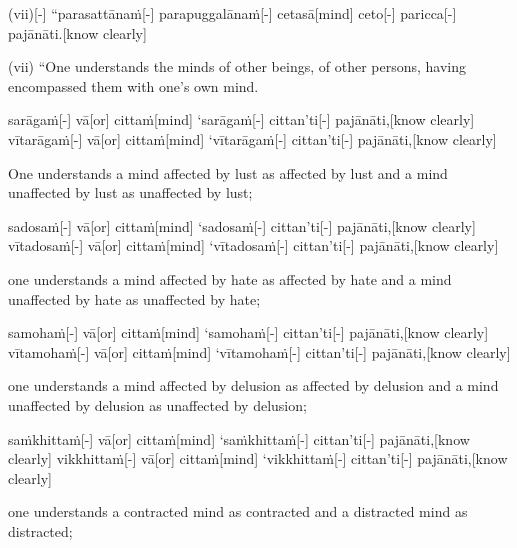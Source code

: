\begin{samepage}
\begingl[glneveryline={\PaliGlossA,\PaliGlossB}]
(vii)[-] “parasattānaṁ[-] parapuggalānaṁ[-] cetasā[mind] ceto[-] paricca[-] pajānāti.[know clearly]
\endgl
\nopagebreak
\linespread{0.5}
\begin{spacin}{0.2}
{\PaliGlossFT (vii) “One understands the minds of other beings, of other persons, having encompassed them with one’s own mind.}
\end{spacin}
\vskip 12pt
\end{samepage}
\begin{samepage}
\begingl[glneveryline={\PaliGlossA,\PaliGlossB}]
sarāgaṁ[-] vā[or] cittaṁ[mind] ‘sarāgaṁ[-] cittan’ti[-] pajānāti,[know clearly] vītarāgaṁ[-] vā[or] cittaṁ[mind] ‘vītarāgaṁ[-] cittan’ti[-] pajānāti,[know clearly]
\endgl
\nopagebreak
\linespread{0.5}
\begin{spacin}{0.2}
{\PaliGlossFT One understands a mind affected by lust as affected by lust and a mind unaffected by lust as unaffected by lust;}
\end{spacin}
\vskip 12pt
\end{samepage}
\begin{samepage}
\begingl[glneveryline={\PaliGlossA,\PaliGlossB}]
sadosaṁ[-] vā[or] cittaṁ[mind] ‘sadosaṁ[-] cittan’ti[-] pajānāti,[know clearly] vītadosaṁ[-] vā[or] cittaṁ[mind] ‘vītadosaṁ[-] cittan’ti[-] pajānāti,[know clearly]
\endgl
\nopagebreak
\linespread{0.5}
\begin{spacin}{0.2}
{\PaliGlossFT one understands a mind affected by hate as affected by hate and a mind unaffected by hate as unaffected by hate;}
\end{spacin}
\vskip 12pt
\end{samepage}
\begin{samepage}
\begingl[glneveryline={\PaliGlossA,\PaliGlossB}]
samohaṁ[-] vā[or] cittaṁ[mind] ‘samohaṁ[-] cittan’ti[-] pajānāti,[know clearly] vītamohaṁ[-] vā[or] cittaṁ[mind] ‘vītamohaṁ[-] cittan’ti[-] pajānāti,[know clearly]
\endgl
\nopagebreak
\linespread{0.5}
\begin{spacin}{0.2}
{\PaliGlossFT one understands a mind affected by delusion as affected by delusion and a mind unaffected by delusion as unaffected by delusion;}
\end{spacin}
\vskip 12pt
\end{samepage}
\begin{samepage}
\begingl[glneveryline={\PaliGlossA,\PaliGlossB}]
saṁkhittaṁ[-] vā[or] cittaṁ[mind] ‘saṁkhittaṁ[-] cittan’ti[-] pajānāti,[know clearly] vikkhittaṁ[-] vā[or] cittaṁ[mind] ‘vikkhittaṁ[-] cittan’ti[-] pajānāti,[know clearly]
\endgl
\nopagebreak
\linespread{0.5}
\begin{spacin}{0.2}
{\PaliGlossFT one understands a contracted mind as contracted and a distracted mind as distracted;}
\end{spacin}
\vskip 12pt
\end{samepage}
